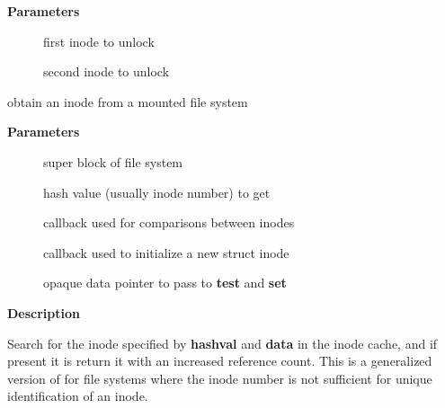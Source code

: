 \documentclass[a4paper,8pt,english]{sphinxmanual}
\begin{document}
\textbf{Parameters}
\begin{description}
\item[{}] \leavevmode
first inode to unlock

\item[{}] \leavevmode
second inode to unlock

\end{description}

\begin{fulllineitems}
\label{filesystems/index:c.iget5_locked}
obtain an inode from a mounted file system

\end{fulllineitems}


\textbf{Parameters}
\begin{description}
\item[{}] \leavevmode
super block of file system

\item[{}] \leavevmode
hash value (usually inode number) to get

\item[{}] \leavevmode
callback used for comparisons between inodes

\item[{}] \leavevmode
callback used to initialize a new struct inode

\item[{}] \leavevmode
opaque data pointer to pass to \textbf{test} and \textbf{set}

\end{description}

\textbf{Description}

Search for the inode specified by \textbf{hashval} and \textbf{data} in the inode cache,
and if present it is return it with an increased reference count. This is
a generalized version of {\hyperref[filesystems/index:c.iget_locked]{\emph{}}} for file systems where the inode
number is not sufficient for unique identification of an inode.
\end{document}
